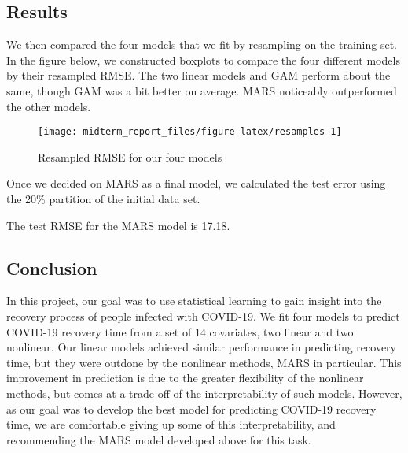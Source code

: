 \documentclass[
]{article}
\begin{document}
\hypertarget{results}{%
\subsection{Results}\label{results}}

We then compared the four models that we fit by resampling on the
training set. In the figure below, we constructed boxplots to compare
the four different models by their resampled RMSE. The two linear models
and GAM perform about the same, though GAM was a bit better on average.
MARS noticeably outperformed the other models.

\begin{figure}

{\centering \texttt{[image: midterm\_report\_files/figure-latex/resamples-1]} 

}

\caption{Resampled RMSE for our four models}\label{fig:resamples}
\end{figure}

Once we decided on MARS as a final model, we calculated the test error
using the 20\% partition of the initial data set.

The test RMSE for the MARS model is 17.18.

\hypertarget{conclusion}{%
\subsection{Conclusion}\label{conclusion}}

In this project, our goal was to use statistical learning to gain
insight into the recovery process of people infected with COVID-19. We
fit four models to predict COVID-19 recovery time from a set of 14
covariates, two linear and two nonlinear. Our linear models achieved
similar performance in predicting recovery time, but they were outdone
by the nonlinear methods, MARS in particular. This improvement in
prediction is due to the greater flexibility of the nonlinear methods,
but comes at a trade-off of the interpretability of such models.
However, as our goal was to develop the best model for predicting
COVID-19 recovery time, we are comfortable giving up some of this
interpretability, and recommending the MARS model developed above for
this task.
\end{document}
